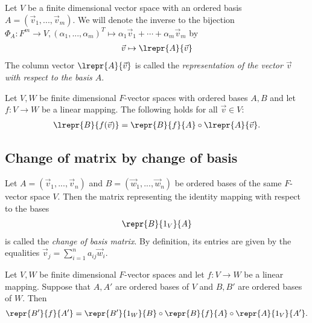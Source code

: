 \documentclass{article}
\begin{document}
\begin{definition}
    Let $V$ be a finite dimensional vector space with an ordered basis $A=(\vec v_1,...,\vec v_m)$.
    We will denote the inverse to the bijection $\Phi_A:F^m\to V,(\alpha_1,...,\alpha_m)^T\mapsto \alpha_1\vec v_1+\cdots+\alpha_m\vec v_m$
    by
    \begin{align*}
        \vec v \mapsto \lrepr{A}{\vec v}
    \end{align*}
    The column vector $\lrepr{A}{\vec v}$ is called the \emph{representation of the vector $\vec v$
    with respect to the basis $A$}.
\end{definition}

\begin{theorem}[Notes 2.3.4]
    Let $V,W$ be finite dimensional $F$-vector spaces with ordered bases $A,B$ and let $f:V\to W$
    be a linear mapping. The following holds for all $\vec v\in V$:
    \begin{align*}
        \lrepr{B}{f(\vec v)}=\repr{B}{f}{A} \circ \lrepr{A}{\vec v}.
    \end{align*}
\end{theorem}

\subsection{Change of matrix by change of basis}

\begin{definition}
    Let $A=(\vec v_1, ...,\vec v_n)$ and $B=(\vec w_1,...,\vec w_n)$ be ordered bases of the same 
    $F$-vector space $V$. Then the matrix representing the identity mapping with respect to the 
    bases 
    \begin{align*}
        \repr{B}{1_V}{A}
    \end{align*}
    is called the \emph{change of basis matrix}. By definition, its entries are given by the 
    equalities $\vec v_j=\sum_{i=1}^n a_{ij}\vec w_i$.
\end{definition}

\begin{theorem}[Notes 2.4.3]
    Let $V,W$ be finite dimensional $F$-vector spaces and let $f:V\to W$ be a linear mapping.
    Suppose that $A,A'$ are ordered bases of $V$ and $B,B'$ are ordered bases of $W$. Then 
    \begin{align*}
        \repr{B'}{f}{A'} = \repr{B'}{1_W}{B}\circ\repr{B}{f}{A}\circ\repr{A}{1_V}{A'}.
    \end{align*} 
\end{theorem}
\end{document}
